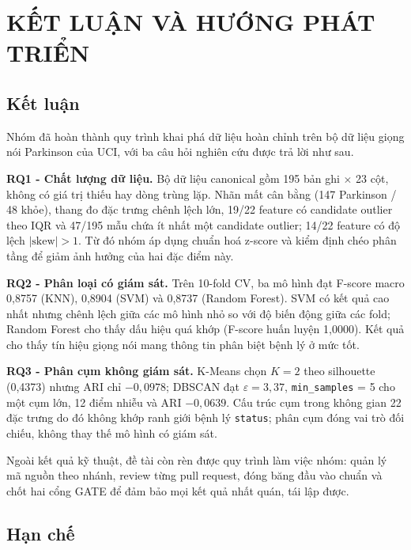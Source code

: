 \chapter{KẾT LUẬN VÀ HƯỚNG PHÁT TRIỂN}
\label{chap:conclusion}

\section{Kết luận}

Nhóm đã hoàn thành quy trình khai phá dữ liệu hoàn chỉnh trên bộ dữ liệu giọng nói
Parkinson của UCI, với ba câu hỏi nghiên cứu được trả lời như sau.

\textbf{RQ1 - Chất lượng dữ liệu.} Bộ dữ liệu canonical gồm 195 bản ghi $\times$ 23 cột,
không có giá trị thiếu hay dòng trùng lặp. Nhãn mất cân bằng (147 Parkinson / 48 khỏe),
thang đo đặc trưng chênh lệch lớn, 19/22 feature có candidate outlier theo IQR và 47/195
mẫu chứa ít nhất một candidate outlier; 14/22 feature có độ lệch $|\text{skew}| > 1$. Từ
đó nhóm áp dụng chuẩn hoá z-score và kiểm định chéo phân tầng để giảm ảnh hưởng của hai
đặc điểm này.

\textbf{RQ2 - Phân loại có giám sát.} Trên 10-fold CV, ba mô hình đạt F-score macro 0,8757
(KNN), 0,8904 (SVM) và 0,8737 (Random Forest). SVM có kết quả cao nhất nhưng chênh lệch
giữa các mô hình nhỏ so với độ biến động giữa các fold; Random Forest cho thấy dấu hiệu
quá khớp (F-score huấn luyện 1,0000). Kết quả cho thấy tín hiệu giọng nói mang thông tin
phân biệt bệnh lý ở mức tốt.

\textbf{RQ3 - Phân cụm không giám sát.} K-Means chọn $K=2$ theo silhouette (0,4373) nhưng
ARI chỉ $-0{,}0978$; DBSCAN đạt $\varepsilon = 3{,}37$, \texttt{min\_samples} = 5 cho một
cụm lớn, 12 điểm nhiễu và ARI $-0{,}0639$. Cấu trúc cụm trong không gian 22 đặc trưng do
đó không khớp ranh giới bệnh lý \texttt{status}; phân cụm đóng vai trò đối chiếu, không thay
thế mô hình có giám sát.

Ngoài kết quả kỹ thuật, đề tài còn rèn được quy trình làm việc nhóm: quản lý mã nguồn theo
nhánh, review từng pull request, đóng băng đầu vào chuẩn và chốt hai cổng GATE để đảm bảo
mọi kết quả nhất quán, tái lập được.

\section{Hạn chế}

